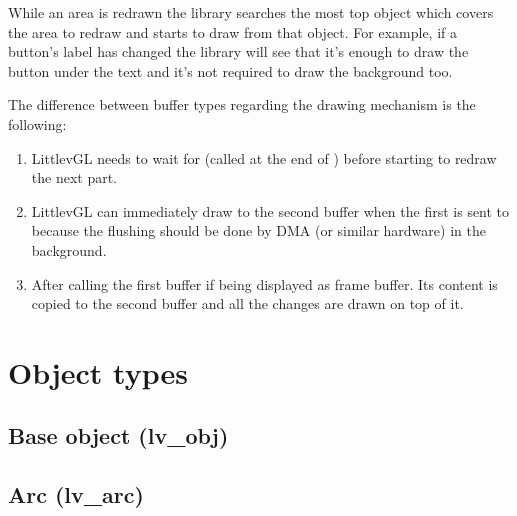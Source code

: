 \documentclass[letterpaper,10pt,english]{sphinxmanual}
\begin{document}
While an area is redrawn the library searches the most top object which covers the area to redraw and starts to draw from that object.
For example, if a button’s label has changed the library will see that it’s enough to draw the button under the text and it’s not required to draw the background too.

The difference between buffer types regarding the drawing mechanism is the following:
\begin{enumerate}
\def\theenumi{\arabic{enumi}}
\def\labelenumi{\theenumi .}
\makeatletter\def\p@enumii{\p@enumi \theenumi .}\makeatother
\item {} 
 LittlevGL needs to wait for  (called at the end of ) before starting to redraw the next part.

\item {} 
 LittlevGL can immediately draw to the second buffer when the first is sent to  because the flushing should be done by DMA (or similar hardware) in the background.

\item {} 
 After calling  the first buffer if being displayed as frame buffer. Its content is copied to the second buffer and all the changes are drawn on top of it.

\end{enumerate}


\section{Object types}
\label{\detokenize{object-types/index:object-types}}\label{\detokenize{object-types/index::doc}}

\subsection{Base object (lv\_obj)}
\label{\detokenize{object-types/obj:base-object-lv-obj}}\label{\detokenize{object-types/obj::doc}}

\subsection{Arc (lv\_arc)}
\label{\detokenize{object-types/arc:arc-lv-arc}}\label{\detokenize{object-types/arc::doc}}
\end{document}
